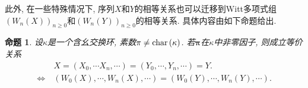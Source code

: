 \documentclass[UTF8, twoside]{ctexart}
\theoremstyle{nonumberplain}
\theoremstyle{nonumberplain}
\theoremstyle{plain}
\newtheorem{mingti}[dingyi]{命题}
\begin{document}
	此外, 在一些特殊情况下, 序列$X$和$Y$的相等关系也可以迁移到Witt多项式组${{\left( {{W}_{n}}\left( X \right) \right)}_{n\ge 0}}$和${{\left( {{W}_{n}}\left( Y \right) \right)}_{n\ge 0}}$的相等关系. 具体内容由如下命题给出. 
	\begin{mingti} \label{202102231936}
		设$\kappa $是一个含幺交换环, 素数$\pi \ne \textup{char}\left( \kappa  \right)$. 
		若$\bm{\pi} $在$\kappa $中非零因子,
		则成立等价关系
		\begin{align*}
			& X=\left( {{X}_{0}},\cdots {{X}_{n}},\cdots  \right)=\left( {{Y}_{0}},\cdots ,{{Y}_{n}},\cdots  \right)=Y. \\ 
			\Longleftrightarrow\ & \left( {{W}_{0}}\left( X \right),\cdots ,{{W}_{n}}\left( X \right),\cdots  \right)=\left( {{W}_{0}}\left( Y \right),\cdots ,{{W}_{n}}\left( Y \right),\cdots  \right).
		\end{align*}
	\end{mingti}
\end{document}
